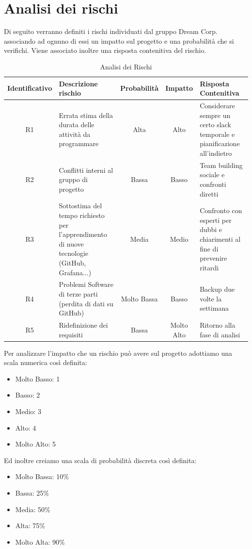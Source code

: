 \section{Analisi dei rischi}

	Di seguito verranno definiti i rischi individuati dal gruppo Dream Corp. associando ad ognuno di essi un impatto sul progetto e una probabilità che si verifichi. Viene associato inoltre una risposta contenitiva del rischio. 
	\begin{table}[!htpb]
		\centering
		\renewcommand{\arraystretch}{2} 
		\begin{tabular}{|c|p{3.6cm}|c|c|p{3.6cm}|}
			\rowcolor{orange!50}
			\hline
			\textbf{Identificativo} & \textbf{Descrizione rischio} & \textbf{Probabilità} & \textbf{Impatto} & \textbf{Risposta Contenitiva}\\
			\hline
			R1 & Errata stima della durata delle attività da programmare & Alta & Alto & Considerare sempre un certo slack temporale e pianificazione all’indietro\\
			\hline
			R2 & Conflitti interni al gruppo di progetto & Bassa & Basso & Team building sociale e confronti diretti\\
			\hline
			R3 & Sottostima del tempo richiesto per l’apprendimento di nuove tecnologie (GitHub, Grafana...) & Media & Medio & Confronto con esperti per dubbi e chiarimenti al fine di prevenire ritardi\\
			\hline
			R4 & Problemi Software di terze parti (perdita di dati su GitHub) & Molto  Bassa & Basso &  Backup due volte la settimana\\
			\hline
			R5 & Ridefinizione dei requisiti & Bassa & Molto Alto & Ritorno alla fase di analisi\\
			\hline
		\end{tabular}
		\caption{Analisi dei Rischi}
	\end{table}
	\clearpage
	Per analizzare l'impatto che un rischio può avere sul progetto adottiamo una scala numerica così definita:
	\begin{itemize}
		\item Molto Basso: 1
		\item Basso: 2
		\item Medio: 3
		\item Alto: 4
		\item Molto Alto: 5
	\end{itemize}
	Ed inoltre creiamo una scala di probabilità discreta così definita:
	\begin{itemize}
		\item Molto Bassa: 10\%
		\item Bassa: 25\%
		\item Media: 50\%
		\item Alta: 75\%
		\item Molto Alta: 90\%
	\end{itemize}
